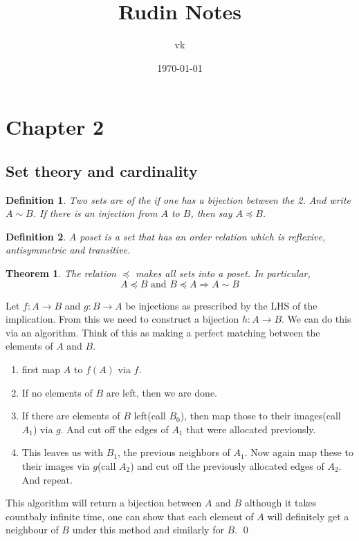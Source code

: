 \documentclass{myclass}
\title{Rudin Notes}
\author{vk}
\date{\today}
\newtheorem*{definition}{Definition}
\newtheorem*{theorem}{Theorem}
\begin{document}
\maketitle

\section*{Chapter 2}

\subsection{Set theory and cardinality}

\begin{definition}
    Two sets are of the  if one has a bijection between the 2. And write $A \sim B$. If there is an injection from $A$ to $B$, then say $A \preceq B$.
\end{definition}

\begin{definition}
    A poset is a set that has an order relation which is reflexive, antisymmetric and transitive.
\end{definition}

\begin{theorem}
    The relation $\preceq$ makes all sets into a poset. In particular, $$A\preceq B\text{ and }B\preceq A \Longrightarrow A\sim B$$
\end{theorem}

\begin{prf}
    Let $f:A\to B$ and $g:B\to A$ be injections as prescribed by the LHS of the implication.
    From this we need to construct a bijection $h:A\to B$. We can do this via an algorithm. Think of this as making a perfect matching between the elements of $A$ and $B$.
    \begin{enumerate}
        \item first map $A$ to $f(A)$ via $f$.
        \item If no elements of $B$ are left, then we are done.
        \item If there are elements of $B$ left(call $B_0$), then map those to their images(call $A_1$) via $g$. And cut off the edges of $A_1$ that were allocated previously.
        \item This leaves us with $B_1$, the previous neighbors of $A_1$. Now again map these to their images via $g$(call $A_2$) and cut off the previously allocated edges of $A_2$. And repeat.
    \end{enumerate}
    This algorithm will return a bijection between $A$ and $B$ although it takes countbaly infinite time, one can show that each element of $A$ will definitely get a neighbour of $B$ under this method and similarly for $B$.
    \qed
\end{prf}
\end{document}

